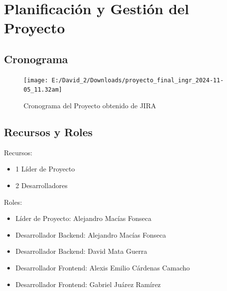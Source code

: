 	\chapter{Planificación y Gestión del Proyecto}
	\section{Cronograma}
	\begin{figure}[h]
		\centering
		\texttt{[image: E:/David\_2/Downloads/proyecto\_final\_ingr\_2024-11-05\_11.32am]}
		\caption{Cronograma del Proyecto obtenido de JIRA}
	\end{figure}
	
	\section{Recursos y Roles}
	Recursos:
	\begin{itemize}
		\item 1 Líder de Proyecto
		\item 2 Desarrolladores
	\end{itemize}

	Roles: 
	\begin{itemize}
		\item Líder de Proyecto: Alejandro Macías Fonseca
		\item Desarrollador Backend: Alejandro Macías Fonseca
		\item Desarrollador Backend: David Mata Guerra
		\item Desarrollador Frontend: Alexis Emilio Cárdenas Camacho
		\item Desarrollador Frontend: Gabriel Juárez Ramírez
	\end{itemize}
	
